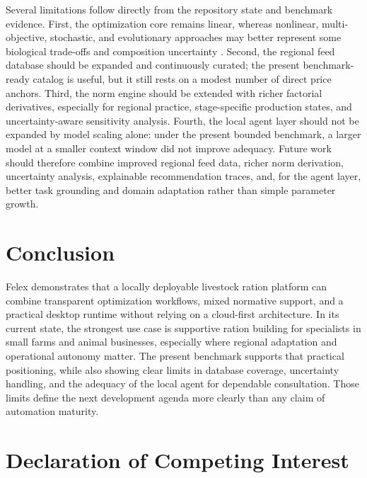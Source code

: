 \documentclass[a4paper,fleqn]{cas-sc}
\begin{document}
Several limitations follow directly from the repository state and benchmark evidence. First, the optimization core remains linear, whereas nonlinear, multi-objective, stochastic, and evolutionary approaches may better represent some biological trade-offs and composition uncertainty \citep{li2022nonlinear, uyeh2018, uyeh2019, das2023, agrawal2025, kumar2025}. Second, the regional feed database should be expanded and continuously curated; the present benchmark-ready catalog is useful, but it still rests on a modest number of direct price anchors. Third, the norm engine should be extended with richer factorial derivatives, especially for regional practice, stage-specific production states, and uncertainty-aware sensitivity analysis. Fourth, the local agent layer should not be expanded by model scaling alone: under the present bounded benchmark, a larger model at a smaller context window did not improve adequacy. Future work should therefore combine improved regional feed data, richer norm derivation, uncertainty analysis, explainable recommendation traces, and, for the agent layer, better task grounding and domain adaptation rather than simple parameter growth.

\section{Conclusion}\label{sec:conclusion}

Felex demonstrates that a locally deployable livestock ration platform can combine transparent optimization workflows, mixed normative support, and a practical desktop runtime without relying on a cloud-first architecture. In its current state, the strongest use case is supportive ration building for specialists in small farms and animal businesses, especially where regional adaptation and operational autonomy matter. The present benchmark supports that practical positioning, while also showing clear limits in database coverage, uncertainty handling, and the adequacy of the local agent for dependable consultation. Those limits define the next development agenda more clearly than any claim of automation maturity.


\section*{Declaration of Competing Interest}
\end{document}
